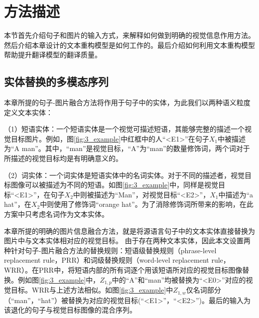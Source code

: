 \section{方法描述}

本节首先介绍句子和图片的输入方式，来解释如何做到明确的视觉信息作用方法。然后介绍本章设计的文本重构模型是如何工作的。最后介绍如何利用文本重构模型帮助提升翻译模型的翻译质量。

\subsection{实体替换的多模态序列}
\label{sec:3_entity_replacement}


本章所提的句子-图片融合方法将作用于句子中的实体，为此我们以两种语义粒度定义文本实体：

（1）{\sffamily 短语实体：}一个短语实体是一个视觉可描述短语，其能够完整的描述一个视觉目标图片。例如，图\ref{fig:3_example}中红框中的人“<E1>”在句子$X_1$中被描述为“A man”。其中，“man”是视觉目标，“A”为“man”的数量修饰词，两个词对于所描述的视觉目标均是有明确意义的。

（2）{\sffamily 词实体：}一个词实体是短语实体中的名词实体。对于不同的描述者，视觉目标图像可以被描述为不同的短语。如图\ref{fig:3_example}中，同样是视觉目标“<E1>”，在句子$X_2$中则被描述为“Man”，对视觉目标“<E2>”，$X_1$中描述为“a hat”，在$X_2$中则使用了修饰词“orange hat”。为了消除修饰词所带来的影响，在此方案中只考虑名词作为文本实体。

本章所提的明确的图片信息融合方法，就是将源语言句子中的文本实体直接替换为图片中与文本实体相对应的视觉目标。
由于存在两种文本实体，因此本文设置两种针对句子-图片融合方法的替换规则：短语级替换规则（phrase-level replacement rule，PRR）和词级替换规则（word-level replacement rule，WRR）。在PRR中，将短语内部的所有词逐个用该短语所对应的视觉目标图像替换。例如图\ref{fig:3_example}中，$Z_{1,p}$中的“A”和“man”均被替换为“<E0>”对应的视觉目标。WRR与上述方法相似。如图\ref{fig:3_example}中$Z_{1,w}$仅名词部分（“man”，“hat”）被替换为对应的视觉目标(“<E1>”，“<E2>”)。最后的输入为该退化的句子与视觉目标图像的混合序列。

